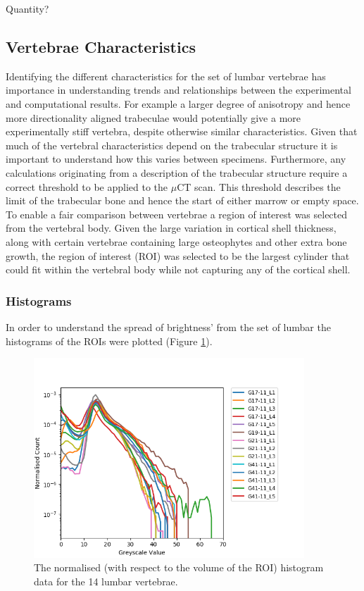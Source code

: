 Quantity?

\subsection{Vertebrae Characteristics}

Identifying the different characteristics for the set of lumbar vertebrae has
importance in understanding trends and relationships between the experimental
and computational results. For example a larger degree of anisotropy and hence
more directionality aligned trabeculae would potentially give a more
experimentally stiff vertebra, despite otherwise similar characteristics. Given
that much of the vertebral characteristics depend on the trabecular structure it
is important to understand how this varies between specimens. Furthermore, any
calculations originating from a description of the trabecular structure require
a correct threshold to be applied to the $\mu$CT scan. This threshold describes
the limit of the trabecular bone and hence the start of either marrow or empty
space. To enable a fair comparison between vertebrae a region of interest was
selected from the vertebral body. Given the large variation in cortical shell
thickness, along with certain vertebrae containing large osteophytes and other
extra bone growth, the region of interest (ROI) was selected to be the largest
cylinder that could fit within the vertebral body while not capturing any of the
cortical shell.

\subsubsection{Histograms}

In order to understand the spread of brightness' from the set of lumbar the
histograms of the ROIs were plotted (Figure \ref{fig:normalisedhistogram}).

\begin{figure}[ht!]
  \centering
  \includegraphics[width=4in]{Chapters/Chapter_HT_images/Normalised_Histogram.png}
  \caption{The normalised (with respect to the volume of the ROI) histogram data
    for the 14 lumbar vertebrae.}
  \label{fig:normalisedhistogram}
\end{figure}


